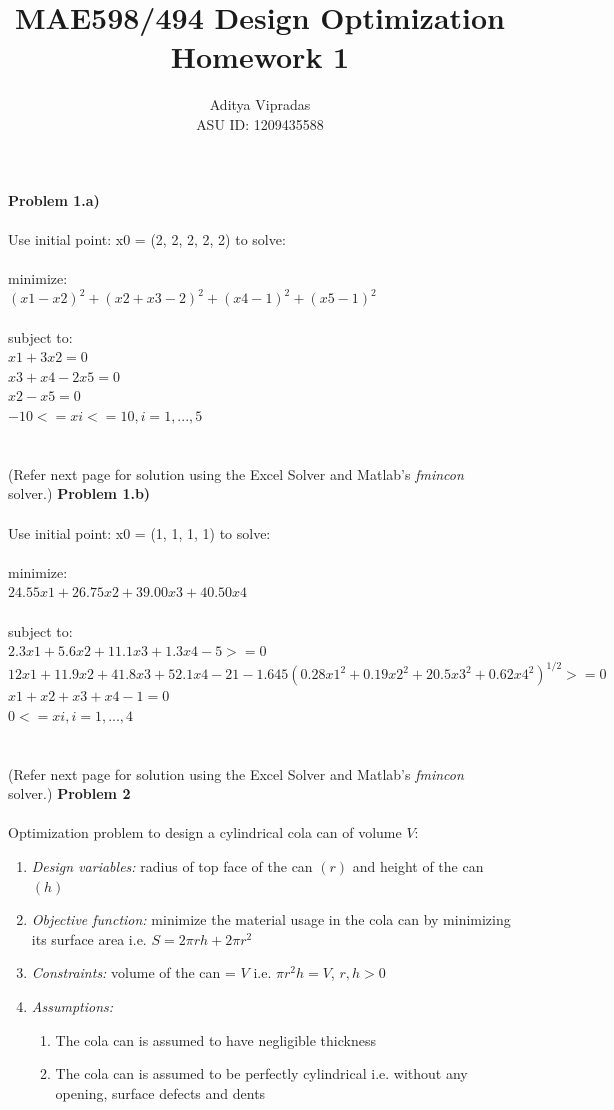 \documentclass[12pt]{article}
\title{\textbf{MAE598/494 Design Optimization\\Homework 1}}
\author{Aditya Vipradas \\ ASU ID: 1209435588}
\begin{document}
\maketitle
\textbf{Problem 1.a)}\\\\
Use initial point: x0 = (2, 2, 2, 2, 2) to solve:\\\\
minimize: \\$(x1 - x2)^{2} + (x2 + x3 - 2)^{2} + (x4 - 1)^{2} + (x5 - 1)^{2}$\\\\
subject to: \\$x1 + 3x2 = 0$\\$x3 + x4 - 2x5 = 0$\\$x2 - x5 = 0$\\$-10 <= xi <= 10, i = 1,...,5$\\\\\\
(Refer next page for solution using the Excel Solver and Matlab's \emph{fmincon} solver.)
\newpage
\textbf{Problem 1.b)}\\\\
Use initial point: x0 = (1, 1, 1, 1) to solve:\\\\
minimize: \\$24.55x1 + 26.75x2 + 39.00x3 + 40.50x4$\\\\
subject to: \\$2.3x1 + 5.6x2 + 11.1x3 + 1.3x4 - 5 >= 0$\\$12x1 + 11.9x2 + 41.8x3 + 52.1x4 - 21 - 1.645(0.28x1^{2} + 0.19x2^{2} + 20.5x3^{2} + 0.62x4^{2})^{1/2} >= 0$\\$x1 + x2 + x3 + x4 - 1 = 0$\\$0 <= xi, i = 1,...,4$\\\\\\
(Refer next page for solution using the Excel Solver and Matlab's \emph{fmincon} solver.)
\newpage
\textbf{Problem 2}\\\\
Optimization problem to design a cylindrical cola can of volume $V$:
\begin{enumerate}
\item \emph{Design variables:} radius of top face of the can $(r)$ and height of the can $(h)$
\item \emph{Objective function:} minimize the material usage in the cola can by minimizing its surface area i.e. $S = 2 \pi r h + 2 \pi r^{2}$
\item \emph{Constraints:} volume of the can = $V$ i.e. $\pi r^{2} h = V$, $r, h > 0$
\item \emph{Assumptions:} 
\begin{enumerate}
\item The cola can is assumed to have negligible thickness
\item The cola can is assumed to be perfectly cylindrical i.e. without any opening, surface defects and dents
\end{enumerate}
\end{enumerate}
\end{document}
